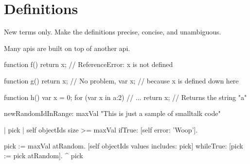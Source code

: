 \chapter{Definitions}
\label{c:definitions}

New terms only. Make the definitions precise, concise, and unambiguous.

Many \acp{api} are built on top of another \ac{api}.

\begin{javascript}[float=htbp,caption=Scoping in JavaScript,label=l:jsscoping]
function f() {
  return x;   // ReferenceError: x is not defined
}

function g() {
  return x;   // No problem,
  var x;      // because x is defined down here
}

function h() {
  var x = 0;
  for (var x in {a:2}) {
    // ...
  }
  return x;   // Returns the string "a"
}
\end{javascript}

\begin{smalltalk}[float=htbp,caption=Smalltalk Sample]
newRandomIdInRange: maxVal
	"This is just a sample of smalltalk code"
	
	| pick |
	self objectIds size >= maxVal ifTrue: [self error: 'Woop'].
	
	pick := maxVal atRandom.
	[self objectIds values includes: pick] 
		whileTrue: [pick := pick atRandom].
	^  pick
\end{smalltalk}

%

%
%

